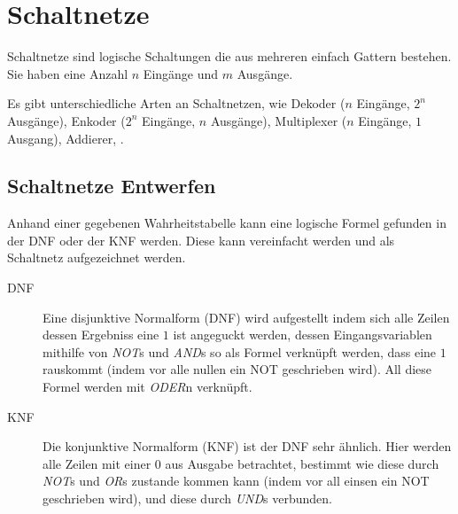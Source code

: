 \documentclass{article}
\begin{document}
\section{Schaltnetze}
Schaltnetze sind logische Schaltungen die aus mehreren einfach Gattern bestehen. Sie haben eine Anzahl $n$ Eingänge und $m$ Ausgänge.

Es gibt unterschiedliche Arten an Schaltnetzen, wie Dekoder ($n$ Eingänge, $2^n$ Ausgänge), Enkoder ($2^n$ Eingänge, $n$ Ausgänge), Multiplexer ($n$ Eingänge, $1$ Ausgang), Addierer, \usw.

\subsection{Schaltnetze Entwerfen}
\label{sec:normalform_bilden}
Anhand einer gegebenen Wahrheitstabelle kann eine logische Formel gefunden in der DNF oder der KNF werden. Diese kann vereinfacht werden und als Schaltnetz aufgezeichnet werden.
\begin{description}
 \item[DNF] Eine disjunktive
Normalform (DNF) wird aufgestellt indem sich alle Zeilen dessen Ergebniss eine $1$ ist  angeguckt werden, dessen Eingangsvariablen mithilfe von \emph{NOT}s und \emph{AND}s so als Formel verknüpft werden, dass eine $1$ rauskommt (indem vor alle nullen ein NOT geschrieben wird). All diese Formel werden mit \emph{ODER}n verknüpft.
 \item[KNF] Die konjunktive Normalform (KNF) ist der DNF sehr ähnlich. Hier werden alle Zeilen mit einer $0$ aus Ausgabe betrachtet, bestimmt wie diese durch \emph{NOT}s und \emph{OR}s zustande kommen kann (indem vor all einsen ein NOT geschrieben wird), und diese durch \emph{UND}s verbunden.
\end{description}
\end{document}

